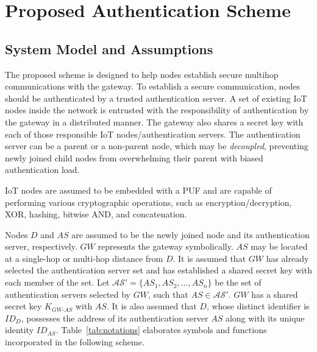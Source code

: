 \documentclass[12pt,a4paper]{report}
\begin{document}
\chapter{Proposed Authentication Scheme}
\label{ch:proposed}

\section{System Model and Assumptions}

The proposed scheme is designed to help nodes establish secure multihop
communications with the gateway.
To establish a secure communication, nodes should be authenticated by a trusted
authentication server.
A set of existing IoT nodes inside the network is entrusted with the responsibility
of authentication by the gateway in a distributed manner.
The gateway also shares a secret key with each of those responsible IoT
nodes/authentication servers.
The authentication server can be a parent or a non-parent node, which may be
\emph{decoupled}, preventing newly joined child nodes from overwhelming their parent
with biased authentication load.

IoT nodes are assumed to be embedded with a PUF and are capable of performing
various cryptographic operations, such as encryption/decryption, XOR, hashing,
bitwise AND, and concatenation.

Nodes $D$ and $AS$ are assumed to be the newly joined node and its authentication
server, respectively.
$GW$ represents the gateway symbolically.
$AS$ may be located at a single-hop or multi-hop distance from $D$.
It is assumed that $GW$ has already selected the authentication server set and has
established a shared secret key with each member of the set.
Let $\mathcal{AS}' = \{AS_1, AS_2, \ldots, AS_n\}$ be the set of authentication
servers selected by $GW$, such that $AS \in \mathcal{AS}'$.
$GW$ has a shared secret key $K_{GW\text{-}AS}$ with $AS$.
It is also assumed that $D$, whose distinct identifier is $ID_D$, possesses the
address of its authentication server $AS$ along with its unique identity $ID_{AS}$.
Table~\ref{tab:notations} elaborates symbols and functions incorporated in the
following scheme.
\end{document}
